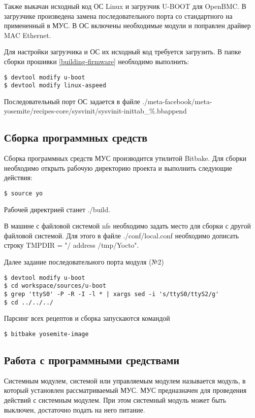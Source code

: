 Также выкачан исходный код ОС Linux и загрузчик U-BOOT для OpenBMC. В загрузчике произведена замена последовательного порта со стандартного на примененный в МУС. В ОС включены необходимые модули и поправлен драйвер MAC Ethernet. 

Для настройки загрузчика и ОС их исходный код требуется загрузить. В папке сборки прошивки \ref{building-firmware} необходимо выполнить:
\begin{lstlisting}
$ devtool modify u-boot
$ devtool modify linux-aspeed
\end{lstlisting}

Последовательный порт ОС задается в файле ./meta-facebook/meta-yosemite/recipes-core/sysvinit/sysvinit-inittab\_\%.bbappend

\subsection{Сборка программных средств}

Сборка программных средств МУС производится утилитой Bitbake. Для сборки необходимо открыть рабочую директорию проекта и выполнить следующие действия:
\label{building-firmware}
\begin{lstlisting}
$ source yo
\end{lstlisting}

Рабочей директрией станет ./build.

В машине с файловой системой nfs необходимо задать место для сборки с другой файловой системой. Для этого в файле ./conf/local.conf необходимо дописать строку TMPDIR = "/ address /tmp/Yocto".

Далее задание последовательного порта модуля (№2)
\begin{lstlisting}
$ devtool modify u-boot
$ cd workspace/sources/u-boot
$ grep 'ttyS0' -P -R -I -l * | xargs sed -i 's/ttyS0/ttyS2/g'
$ cd ../../../
\end{lstlisting}

Парсинг всех рецептов и сборка запускаются командой
\begin{lstlisting}
$ bitbake yosemite-image
\end{lstlisting}

\subsection{Работа с программными средствами}

Системным модулем, системой или управляемым модулем называется модуль, в который установлен рассматриваемый МУС. МУС предназначен для проведения действий с системным модулем. При этом системный модуль может быть выключен, достаточно подать на него питание.

